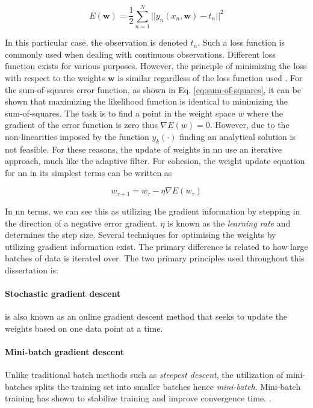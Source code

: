 \begin{equation}\label{eq:sum-of-squares}
  E(\mathbf{w}) = \frac{1}{2}\sum_{n=1}^N ||y_n(x_n,\mathbf{w}) - t_n ||^2
\end{equation}

In this particular case, the observation is denoted $t_n$. Such a loss function is commonly used when dealing with continuous observations. Different loss function exists for various purposes. However, the principle of minimizing the loss with respect to the weights $\mathbf{w}$ is similar regardless of the loss function used \cite{M.Bishop2006}. For the sum-of-squares error function, as shown in Eq. \ref{eq:sum-of-squares}, it can be shown that maximizing the likelihood function is identical to minimizing the sum-of-squares. The task is to find a point in the weight space $w$ where the gradient of the error function is zero thus $\nabla E(w) = 0$. However, due to the non-linearities imposed by the function $y_k(\cdot)$ finding an analytical solution is not feasible. For these reasons, the update of weights in \gls{nn} use an iterative approach, much like the adaptive filter. For cohesion, the weight update equation for \gls{nn} in its simplest terms can be written as

\begin{equation}\label{eq:weight_update}
    w_{\tau + 1} = w_{\tau} - \eta \nabla E(w_{\tau})
\end{equation}

In \gls{nn} terms, we can see this as utilizing the gradient information by stepping in the direction of a negative error gradient. $\eta$ is known as the \emph{learning rate} and determines the step size. Several techniques for optimising the weights by utilizing gradient information exist. The primary difference is related to how large batches of data is iterated over. The two primary principles used throughout this dissertation is:

\paragraph{Stochastic gradient descent}
is also known as an online gradient descent method that seeks to update the weights based on one data point at a time.

\paragraph{Mini-batch gradient descent}
Unlike traditional batch methods such as \emph{steepest descent}, the utilization of mini-batches splits the training set into smaller batches hence \emph{mini-batch}. Mini-batch training has shown to stabilize training and improve convergence time. \cite{Nielsen2015}.

